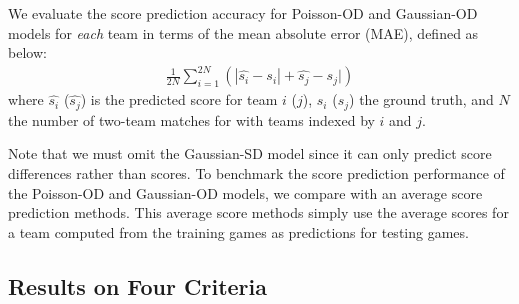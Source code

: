 We evaluate the score prediction accuracy for Poisson-OD and
Gaussian-OD models for \emph{each} team in terms of the mean absolute
error (MAE), defined as below:
\begin{align}
    \frac{1}{2N} \sum_{i=1}^{2N} \left(| \hat{s_i} - s_i | + \hat{s_j} - s_j |\right)
\end{align}
where $\hat{s_i}$ ($\hat{s_j}$) is the predicted score for team $i$ ($j$), $s_i$ ($s_j$) the ground truth, and $N$ the number of two-team matches for with teams indexed by $i$ and $j$. 

Note that we must omit the Gaussian-SD model since it can only predict score differences rather than scores. To benchmark the score prediction performance of the Poisson-OD and Gaussian-OD models, we compare with an average score prediction methods. This average score methods simply use the average scores for a team computed from the training games as predictions for testing games.

\subsection{Results on Four Criteria}
\label{sec:results}

